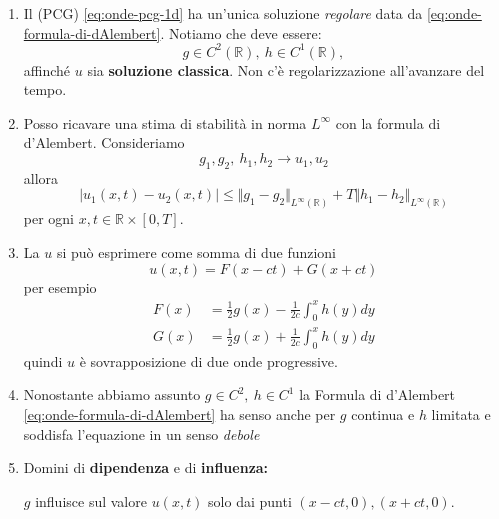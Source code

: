 \documentclass[10pt,a4paper,twoside,openright]{book}
\begin{document}
\begin{enumerate}
	\item Il (PCG) \eqref{eq:onde-pcg-1d} ha un'unica soluzione \textit{regolare} data da \eqref{eq:onde-formula-di-dAlembert}. Notiamo che deve essere:
		\begin{equation*}
			g\in C^{2}(\mathbb{R}) ,\ h\in C^{1}(\mathbb{R}) ,
		\end{equation*}
		affinché $\displaystyle u$ sia\textbf{ soluzione classica}. Non c'è regolarizzazione all'avanzare del tempo.
	\item Posso ricavare una stima di stabilità in norma $\displaystyle L^{\infty }$ con la formula di d'Alembert. Consideriamo
		\begin{equation*}
			g_{1} ,g_{2} ,\ h_{1} ,h_{2}\rightarrow u_{1} ,u_{2}
		\end{equation*}
		allora
		\begin{equation*}
			| u_{1}( x,t) -u_{2}( x,t)| \leqslant \Vert g_{1} -g_{2}\Vert _{L^{\infty }(\mathbb{R})} +T\Vert h_{1} -h_{2}\Vert _{L^{\infty }(\mathbb{R})}
		\end{equation*}
		per ogni $\displaystyle x,t\in \mathbb{R} \times [ 0,T]$.
	\item La $\displaystyle u$ si può esprimere come somma di due funzioni
		\begin{equation*}
			u( x,t) =F( x-ct) +G( x+ct)
		\end{equation*}
		per esempio
		\begin{align*}
			F( x) & =\frac{1}{2} g( x) -\frac{1}{2c}\int _{0}^{x} h( y) dy \\
			G( x) & =\frac{1}{2} g( x) +\frac{1}{2c}\int _{0}^{x} h( y) dy 
		\end{align*}
		quindi $\displaystyle u$ è sovrapposizione di due onde progressive.
	\item Nonostante abbiamo assunto $\displaystyle g\in C^{2} ,\ h\in C^{1}$ la Formula di d'Alembert \eqref{eq:onde-formula-di-dAlembert} ha senso anche per $\displaystyle g$ continua e $\displaystyle h$ limitata e soddisfa l'equazione in un senso \textit{debole}
			
	\item Domini di \textbf{dipendenza} e di \textbf{influenza:}
			
			
			$\displaystyle g$ influisce sul valore $\displaystyle u( x,t)$ solo dai punti $\displaystyle ( x-ct,0) ,( x+ct,0)$.
			

\end{enumerate}
\end{document}
